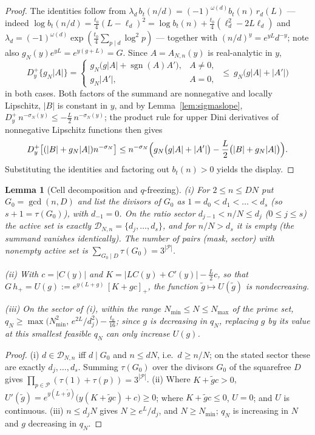 \documentclass[11pt]{article}
\newtheorem{lemma}[theorem]{Lemma}
\theoremstyle{definition}
\newcommand{\calP}{\mathcal{P}}
\begin{document}
\begin{proof}
The identities follow from
$\lambda_d\,b_t(n/d)=(-1)^{\omega(d)}b_t(n)\,r_d(L)$ --- indeed
$\log b_t(n/d)=\frac{t_0}4(L-\ell_d)^2
=\log b_t(n)+\frac{t_0}4(\ell_d^2-2L\ell_d)$ and
$\lambda_d=(-1)^{\omega(d)}\exp(\frac{t_0}4\sum_{p\mid d}\log^2p)$
--- together with $(n/d)^y=e^{yL}d^{-y}$; note also
$g_N(y)e^{yL}=e^{y(g+L)}=G$. Since $A=A_{N,n}(y)$ is real-analytic
in $y$,
\[
D^+_y\bigl\{g_N|A|\bigr\}
=\begin{cases}
g_N\bigl(g|A|+\operatorname{sgn}(A)A'\bigr),&A\neq0,\\
g_N|A'|,&A=0,
\end{cases}
\ \le\ g_N\bigl(g|A|+|A'|\bigr)
\]
in both cases. Both factors of the summand are nonnegative and
locally Lipschitz, $|B|$ is constant in $y$, and by
Lemma~\ref{lem:sigmaslope},
$D^+_y\,n^{-\sigma_N(y)}\le-\frac L2\,n^{-\sigma_N(y)}$; the
product rule for upper Dini derivatives of nonnegative Lipschitz
functions then gives
\[
D^+_y\bigl[(|B|+g_N|A|)n^{-\sigma_N}\bigr]
\le n^{-\sigma_N}\Bigl(g_N\bigl(g|A|+|A'|\bigr)
-\frac L2\bigl(|B|+g_N|A|\bigr)\Bigr).
\]
Substituting the identities and factoring out $b_t(n)>0$ yields the
display.
\end{proof}

\begin{lemma}[Cell decomposition and $q$-freezing]\label{lem:cells}
\textup{(i)} For $2\le n\le DN$ put $G_0=\gcd(n,D)$ and list the
divisors of $G_0$ as $1=d_0<d_1<\dots<d_s$ (so $s+1=\tau(G_0)$),
with $d_{-1}=0$. On the ratio sector $d_{j-1}<n/N\le d_j$
($0\le j\le s$) the active set is exactly
$\mathcal D_{N,n}=\{d_j,\dots,d_s\}$, and for $n/N>d_s$ it is
empty (the summand vanishes identically). The number of pairs
(mask, sector) with nonempty active set is
$\sum_{G_0\mid D}\tau(G_0)=3^{|\calP|}$.

\textup{(ii)} With $c=|C(y)|$ and
$K=|LC(y)+C'(y)|-\frac L2c$, so that
$G\,h_+=U(g):=e^{y(L+g)}\,[K+gc]_+$, the function
$\tilde g\mapsto U(\tilde g)$ is nondecreasing.

\textup{(iii)} On the sector of \textup{(i)}, within the range
$N_{\min}\le N\le N_{\max}$ of the prime set,
$q_N\ge\max\bigl(N_{\min}^2,\,e^{2L}/d_j^2\bigr)-\frac{t_0}{16}$;
since $g$ is decreasing in $q_N$, replacing $g$ by its value at
this smallest feasible $q_N$ can only increase $U(g)$.
\end{lemma}

\begin{proof}
(i) $d\in\mathcal D_{N,n}$ iff $d\mid G_0$ and $n\le dN$, i.e.\
$d\ge n/N$; on the stated sector these are exactly
$d_j,\dots,d_s$. Summing $\tau(G_0)$ over the divisors $G_0$ of the
squarefree $D$ gives $\prod_{p\in\calP}(\tau(1)+\tau(p))
=3^{|\calP|}$. (ii) Where $K+\tilde gc>0$,
$U'(\tilde g)=e^{y(L+\tilde g)}\bigl(y(K+\tilde gc)+c\bigr)\ge0$;
where $K+\tilde gc\le0$, $U=0$; and $U$ is continuous. (iii)
$n\le d_jN$ gives $N\ge e^L/d_j$, and $N\ge N_{\min}$; $q_N$ is
increasing in $N$ and $g$ decreasing in $q_N$.
\end{proof}
\end{document}
